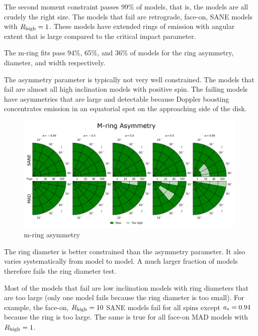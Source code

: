 The second moment constraint passes 99\% of models, that is, the models are all crudely the right size.  The models that fail are retrograde, face-on, SANE models with $R_\mathrm{high} = 1$. These models have extended rings of emission with angular extent that is large compared to the critical impact parameter.

\label{sec:mring}

The m-ring fits pass 94\%, 65\%, and 36\% of models for the ring asymmetry, diameter, and width respectively.

The asymmetry parameter is typically not very well constrained.  The models that fail are almost all high inclination models with positive spin.  The failing models have asymmetries that are large and detectable because Doppler boosting concentrates emission in an equatorial spot on the approaching side of the disk.

\begin{figure}
  \centering
  \includegraphics[width=\columnwidth]{./figures/Mring_f1_Constraints.png}
  \caption{m-ring asymmetry}
  \label{fig:cmp_m-ring_asymm}
\end{figure}

The ring diameter is better constrained than the asymmetry parameter.  It also varies systematically from model to model.  A much larger fraction of models therefore fails the ring diameter test.

Most of the models that fail are low inclination models with ring diameters that are too large (only one model fails because the ring diameter is too small).  For example, the face-on, $R_\mathrm{high} = 10$ SANE models fail for all spins except $a_* = 0.94$ because the ring is too large.  The same is true for all face-on MAD models with $R_\mathrm{high} = 1$.

